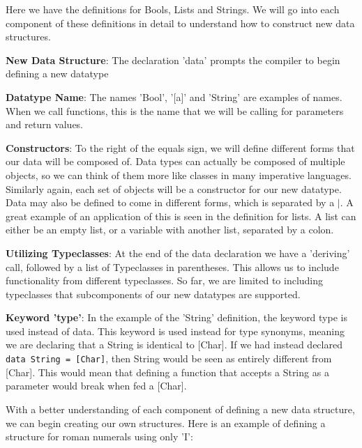 \documentclass{article}
\begin{document}
            \medskip\noindent
            Here we have the definitions for Bools, Lists and Strings. We will go into each component of these definitions in detail to understand how to construct new data structures.
            
            \medskip\noindent
            \textbf{New Data Structure}: The declaration 'data' prompts the compiler to begin defining a new datatype
            
            \medskip\noindent
            \textbf{Datatype Name}: The names 'Bool', '[a]' and 'String' are examples of names. When we call functions, this is the name that we will be calling for parameters and return values.
            
            \medskip\noindent
            \textbf{Constructors}: To the right of the equals sign, we will define different forms that our data will be composed of. Data types can actually be composed of multiple objects, so we can think of them more like classes in many imperative languages. Similarly again, each set of objects will be a constructor for our new datatype. Data may also be defined to come in different forms, which is separated by a $|$. A great example of an application of this is seen in the definition for lists. A list can either be an empty list, or a variable with another list, separated by a colon.
            
            \medskip\noindent
            \textbf{Utilizing Typeclasses}: At the end of the data declaration we have a 'deriving' call, followed by a list of Typeclasses in parentheses. This allows us to include functionality from different typeclasses. So far, we are limited to including typeclasses that subcomponents of our new datatypes are supported.
            
            \medskip\noindent
            \textbf{Keyword 'type'}: In the example of the 'String' definition, the keyword type is used instead of data. This keyword is used instead for type synonyms, meaning we are declaring that a String is identical to [Char]. If we had instead declared \lstinline{data String = [Char]}, then String would be seen as entirely different from [Char]. This would mean that defining a function that accepts a String as a parameter would break when fed a [Char].
            
            \medskip\noindent
            With a better understanding of each component of defining a new data structure, we can begin creating our own structures. Here is an example of defining a structure for roman numerals using only 'I':
            
\end{document}
